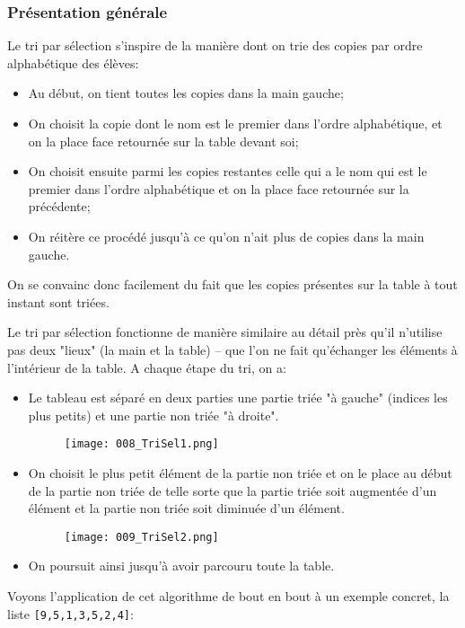 \documentclass[12pt]{article}
\begin{document}
	\subsubsection*{Présentation générale}
	Le tri par sélection s'inspire de la manière dont on trie des copies par ordre alphabétique des élèves:
	\begin{itemize}
		\item Au début, on tient toutes les copies dans la main gauche;
		\item On choisit la copie dont le nom est le premier dans l'ordre alphabétique, et on la place face retournée sur la table devant soi;
		\item On choisit ensuite parmi les copies restantes celle qui a le nom qui est le premier dans l'ordre alphabétique et on la place face retournée sur la précédente;
		\item On réitère ce procédé jusqu'à ce qu'on n'ait plus de copies dans la main gauche.
	\end{itemize}
	
	On se convainc donc facilement du fait que les copies présentes sur la table à tout instant sont triées.
	
	Le tri par sélection fonctionne de manière similaire au détail près qu'il n'utilise pas deux "lieux" (la main et la table) -- que l'on ne fait qu'échanger les éléments à l'intérieur de la table. A chaque étape du tri, on a:
	\begin{itemize}
		\item Le tableau est séparé en deux parties une partie triée "à gauche" (indices les plus petits) et une partie non triée "à droite".
		\begin{figure}[H]
			\centering
			\texttt{[image: 008\_TriSel1.png]}
		\end{figure}
		\item On choisit le plus petit élément de la partie non triée et on le place au début de la partie non triée de telle sorte que la partie triée soit augmentée d'un élément et la partie non triée soit diminuée d'un élément.
		\begin{figure}[H]
			\centering
			\texttt{[image: 009\_TriSel2.png]}
		\end{figure}
		\item On poursuit ainsi jusqu'à avoir parcouru toute la table.
	\end{itemize}
	
	Voyons l'application de cet algorithme de bout en bout à un exemple concret, la liste \texttt{[9,5,1,3,5,2,4]}:
	
\end{document}
